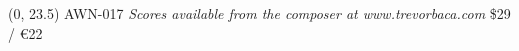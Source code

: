 \documentclass[10pt]{article}
\begin{document}
\begin{textblock}{23}(0, 23.5)
AWN-017 \hfill
\textit{Scores available from the composer at www.trevorbaca.com} \hfill
\$29 / \euro 22
\end{textblock}
\end{document}
